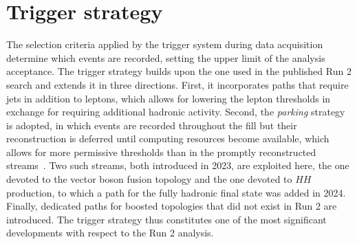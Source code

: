 










\section{Trigger strategy}
\label{sec:triggers}
%
The selection criteria applied by the trigger system during data acquisition determine which events are recorded, setting the upper limit of the analysis acceptance. The trigger strategy builds upon the one used in the published Run 2 search and extends it in three directions. First, it incorporates paths that require jets in addition to leptons, which allows for lowering the lepton thresholds in exchange for requiring additional hadronic activity. Second, the \textit{parking} strategy is adopted, in which events are recorded throughout the fill but their reconstruction is deferred until computing resources become available, which allows for more permissive thresholds than in the promptly reconstructed streams~\cite{CMS:2024zhe,CMS-DP-2025-015}. Two such streams, both introduced in 2023, are exploited here, the one devoted to the vector boson fusion topology and the one devoted to $HH$ production, to which a path for the fully hadronic final state was added in 2024. Finally, dedicated paths for boosted topologies that did not exist in Run 2 are introduced. The trigger strategy thus constitutes one of the most significant developments with respect to the Run 2 analysis.

